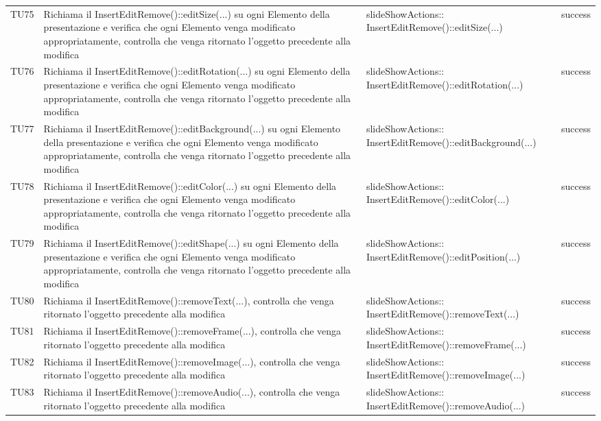 \begin{longtable} [c]{| p{1cm} | p{6cm} | p{7cm} | p{1.5cm} |}
		 		 TU75 & Richiama il InsertEditRemove()::editSize(...) su ogni Elemento\ped{g} della presentazione e verifica che ogni Elemento\ped{g} venga modificato appropriatamente, controlla che venga ritornato l'oggetto precedente alla modifica   & slideShowActions:: InsertEditRemove()::editSize(...) & success \\
		 		 TU76 & Richiama il InsertEditRemove()::editRotation(...) su ogni Elemento\ped{g} della presentazione e verifica che ogni Elemento\ped{g} venga modificato appropriatamente, controlla che venga ritornato l'oggetto precedente alla modifica   & slideShowActions:: InsertEditRemove()::editRotation(...) & success \\
		 		 TU77 & Richiama il InsertEditRemove()::editBackground(...) su ogni Elemento\ped{g} della presentazione e verifica che ogni Elemento\ped{g} venga modificato appropriatamente, controlla che venga ritornato l'oggetto precedente alla modifica   & slideShowActions:: InsertEditRemove()::editBackground(...) & success \\
		 		 TU78 & Richiama il InsertEditRemove()::editColor(...) su ogni Elemento\ped{g} della presentazione e verifica che ogni Elemento\ped{g} venga modificato appropriatamente, controlla che venga ritornato l'oggetto precedente alla modifica   & slideShowActions:: InsertEditRemove()::editColor(...) & success \\
		 		 TU79 & Richiama il InsertEditRemove()::editShape(...) su ogni Elemento\ped{g} della presentazione e verifica che ogni Elemento\ped{g} venga modificato appropriatamente, controlla che venga ritornato l'oggetto precedente alla modifica   & slideShowActions:: InsertEditRemove()::editPosition(...) & success \\
		 		 TU80 & Richiama il InsertEditRemove()::removeText(...), controlla che venga ritornato l'oggetto precedente alla modifica & slideShowActions:: InsertEditRemove()::removeText(...) & success \\
		 		 TU81 & Richiama il InsertEditRemove()::removeFrame(...), controlla che venga ritornato l'oggetto precedente alla modifica & slideShowActions:: InsertEditRemove()::removeFrame(...) & success \\
		 		 TU82 & Richiama il InsertEditRemove()::removeImage(...), controlla che venga ritornato l'oggetto precedente alla modifica & slideShowActions:: InsertEditRemove()::removeImage(...) & success \\
		 		 TU83 & Richiama il InsertEditRemove()::removeAudio(...), controlla che venga ritornato l'oggetto precedente alla modifica & slideShowActions:: InsertEditRemove()::removeAudio(...) & success \\

\end{longtable}
